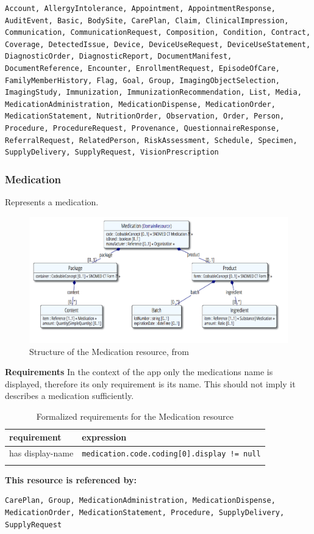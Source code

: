 \documentclass{article}
\begin{document}
\begin{lstlisting}[breaklines]
Account, AllergyIntolerance, Appointment, AppointmentResponse, AuditEvent, Basic, BodySite, CarePlan, Claim, ClinicalImpression, Communication, CommunicationRequest, Composition, Condition, Contract, Coverage, DetectedIssue, Device, DeviceUseRequest, DeviceUseStatement, DiagnosticOrder, DiagnosticReport, DocumentManifest, DocumentReference, Encounter, EnrollmentRequest, EpisodeOfCare, FamilyMemberHistory, Flag, Goal, Group, ImagingObjectSelection, ImagingStudy, Immunization, ImmunizationRecommendation, List, Media, MedicationAdministration, MedicationDispense, MedicationOrder, MedicationStatement, NutritionOrder, Observation, Order, Person, Procedure, ProcedureRequest, Provenance, QuestionnaireResponse, ReferralRequest, RelatedPerson, RiskAssessment, Schedule, Specimen, SupplyDelivery, SupplyRequest, VisionPrescription
\end{lstlisting}

\subsubsection{Medication}\label{res:medication}
Represents a medication.
\\
\begin{figure}[H]
\centering
\includegraphics[width=\linewidth]{resources/FHIR/Medication.png}
\caption{Structure of the Medication resource, from \citep{res-medication}}
\label{fig:structure-medication}
\end{figure}
\textbf{Requirements}\label{res:medication:requirements}
In the context of the app only the medications name is
displayed, therefore its only requirement is its name.
This should not imply it describes a medication sufficiently.
\\
\begin{longtable}[H]{@{}ll@{}}
\toprule
requirement & expression\\
\midrule
has display-name & \texttt{medication.code.coding[0].display != null} \\
\bottomrule
\caption{Formalized requirements for the Medication resource}
\end{longtable}
\textbf{This resource is referenced by:}\label{res:medication:referenced-by}
\\
\begin{lstlisting}[breaklines]
CarePlan, Group, MedicationAdministration, MedicationDispense, MedicationOrder, MedicationStatement, Procedure, SupplyDelivery, SupplyRequest
\end{lstlisting}
\end{document}
